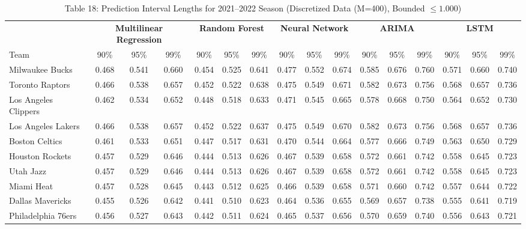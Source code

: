 \documentclass[11pt,a4paper]{article}
\begin{document}
\begin{table}[H]
\centering
\caption{Table 18: Prediction Interval Lengths for 2021--2022 Season (Discretized Data (M=400), Bounded $\le 1.000$)}
\label{tab:team_table18}
\tiny
\setlength{\tabcolsep}{1.5pt}
\begin{tabular}{l ccc ccc ccc ccc ccc}
\toprule
 & \multicolumn{3}{c}{\textbf{Multilinear Regression}} & \multicolumn{3}{c}{\textbf{Random Forest}} & \multicolumn{3}{c}{\textbf{Neural Network}} & \multicolumn{3}{c}{\textbf{ARIMA}} & \multicolumn{3}{c}{\textbf{LSTM}} \\
\cmidrule(lr){2-4} \cmidrule(lr){5-7} \cmidrule(lr){8-10} \cmidrule(lr){11-13} \cmidrule(lr){14-16}
Team & 90\% & 95\% & 99\% & 90\% & 95\% & 99\% & 90\% & 95\% & 99\% & 90\% & 95\% & 99\% & 90\% & 95\% & 99\% \\
\midrule
Milwaukee Bucks & 0.468 & 0.541 & 0.660 & 0.454 & 0.525 & 0.641 & 0.477 & 0.552 & 0.674 & 0.585 & 0.676 & 0.760 & 0.571 & 0.660 & 0.740 \\
Toronto Raptors & 0.466 & 0.538 & 0.657 & 0.452 & 0.522 & 0.638 & 0.475 & 0.549 & 0.671 & 0.582 & 0.673 & 0.756 & 0.568 & 0.657 & 0.736 \\
Los Angeles Clippers & 0.462 & 0.534 & 0.652 & 0.448 & 0.518 & 0.633 & 0.471 & 0.545 & 0.665 & 0.578 & 0.668 & 0.750 & 0.564 & 0.652 & 0.730 \\
Los Angeles Lakers & 0.466 & 0.538 & 0.657 & 0.452 & 0.522 & 0.637 & 0.475 & 0.549 & 0.670 & 0.582 & 0.673 & 0.756 & 0.568 & 0.657 & 0.736 \\
Boston Celtics & 0.461 & 0.533 & 0.651 & 0.447 & 0.517 & 0.631 & 0.470 & 0.544 & 0.664 & 0.577 & 0.666 & 0.749 & 0.563 & 0.650 & 0.729 \\
Houston Rockets & 0.457 & 0.529 & 0.646 & 0.444 & 0.513 & 0.626 & 0.467 & 0.539 & 0.658 & 0.572 & 0.661 & 0.742 & 0.558 & 0.645 & 0.723 \\
Utah Jazz & 0.457 & 0.529 & 0.646 & 0.444 & 0.513 & 0.626 & 0.467 & 0.539 & 0.658 & 0.572 & 0.661 & 0.742 & 0.558 & 0.645 & 0.723 \\
Miami Heat & 0.457 & 0.528 & 0.645 & 0.443 & 0.512 & 0.625 & 0.466 & 0.539 & 0.658 & 0.571 & 0.660 & 0.742 & 0.557 & 0.644 & 0.722 \\
Dallas Mavericks & 0.455 & 0.526 & 0.642 & 0.441 & 0.510 & 0.623 & 0.464 & 0.536 & 0.655 & 0.569 & 0.657 & 0.738 & 0.555 & 0.641 & 0.719 \\
Philadelphia 76ers & 0.456 & 0.527 & 0.643 & 0.442 & 0.511 & 0.624 & 0.465 & 0.537 & 0.656 & 0.570 & 0.659 & 0.740 & 0.556 & 0.643 & 0.721 \\

\end{tabular}
\end{table}
\end{document}
